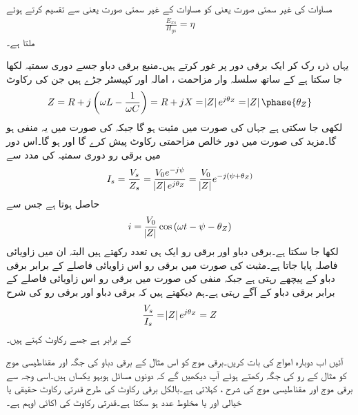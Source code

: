 مساوات  کی غیر سمتی صورت یعنی  کو مساوات  کے غیر سمتی صورت یعنی  سے تقسیم کرتے ہوئے
\begin{align}
\frac{E_{xs}}{H_{ys}}=\eta
\end{align}
ملتا ہے۔

یہاں ذرہ رک کر ایک برقی دور پر غور کرتے ہیں۔منبع برقی دباو  جسے دوری سمتیہ  لکھا جا سکتا ہے کے ساتھ سلسلہ وار مزاحمت ، امالہ  اور کپیسٹر  جڑے ہیں جن کی رکاوٹ 
\begin{align*}
Z=R+j\left( \omega L -\frac{1}{\omega C}\right)=R+jX=\abs{Z} e^{j \theta_Z}=\abs{Z}\phase{\theta_Z}
\end{align*}
لکھی جا سکتی ہے  جہاں  کی صورت میں  مثبت ہو گا جبکہ  کی صورت میں یہ منفی ہو گا۔مزید  کی صورت میں دور خالص مزاحمتی رکاوٹ پیش کرے گا اور  ہو گا۔اس دور میں برقی رو دوری سمتیہ کی مدد سے
\begin{align*}
I_s=\frac{V_s}{Z_s}=\frac{V_0 e^{-j\psi}}{\abs{Z}e^{j \theta_Z}}=\frac{V_0}{\abs{Z}}e^{-j(\psi+\theta_Z)}
\end{align*}
حاصل ہوتا ہے جس سے
\begin{align*}
i=\frac{V_0}{\abs{Z}}\cos \left(\omega t -\psi-\theta_Z \right)
\end{align*}
لکھا جا سکتا ہے۔برقی دباو اور برقی رو ایک ہی تعدد رکھتے ہیں البتہ ان میں زاویائی فاصلہ  پایا جاتا ہے۔مثبت  کی صورت میں برقی رو اس زاویائی فاصلے کے برابر برقی دباو کے پیچھے رہتی ہے جبکہ منفی  کی صورت میں برقی رو اس زاویائی فاصلے کے برابر برقی دباو کے آگے رہتی ہے۔ہم دیکھتے ہیں کہ برقی دباو اور برقی رو کی شرح
\begin{align*}
\frac{V_s}{I_s}=\abs{Z} e^{j \theta_Z}=Z
\end{align*}
کے برابر ہے جسے رکاوٹ کہتے ہیں۔

آئیں اب دوبارہ امواج کی بات کریں۔برقی موج کو اس مثال کے برقی دباو کی جگہ اور مقناطیسی موج کو مثال کے رو کی جگہ رکھتے ہوئے آپ دیکھیں گے کہ دونوں مسائل ہوبہو یکساں ہیں۔اسی وجہ سے  برقی موج  اور مقناطیسی موج  کی شرح ،   کہلاتی ہے۔بالکل برقی رکاوٹ کی طرح قدرتی رکاوٹ حقیقی یا خیالی اور یا مخلوط عدد ہو سکتا ہے۔قدرتی رکاوٹ کی اکائی اوہم  ہے۔

